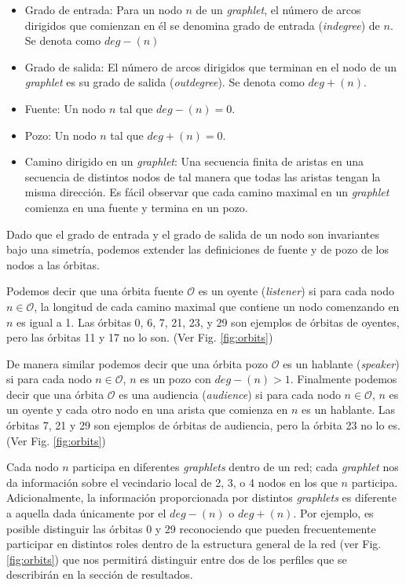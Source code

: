\begin{itemize}
    \item Grado de entrada: Para un nodo $n$ de un \textit{graphlet}, el número de arcos dirigidos que comienzan en él se denomina grado de entrada (\textit{indegree}) de $n$. Se denota como $deg-(n)$
    \item Grado de salida: El número de arcos dirigidos que terminan en el nodo de un \textit{graphlet} es su grado de salida (\textit{outdegree}). Se denota como $deg+(n)$.
    \item Fuente: Un nodo $n$ tal que $deg-(n)=0$. 
    \item Pozo: Un nodo $n$ tal que $deg+(n)=0$.
    \item Camino dirigido en un \textit{graphlet}: Una secuencia finita de aristas en una secuencia de distintos nodos de tal manera que todas las aristas tengan la misma dirección. Es fácil observar que cada camino maximal en un \textit{graphlet} comienza en una fuente y termina en un pozo. %
\end{itemize}

Dado que el grado de entrada y el grado de salida de un nodo son invariantes bajo una simetría, podemos extender las definiciones de fuente y de pozo de los nodos a las órbitas. 

Podemos decir que una órbita fuente $\mathcal{O}$ es un oyente (\emph{listener}) si para cada nodo $n\in\mathcal{O}$, la longitud de cada camino maximal que contiene un nodo comenzando en $n$ es igual a 1. Las órbitas 0, 6, 7, 21, 23, y 29 son ejemplos de órbitas de oyentes, pero las órbitas 11 y 17 no lo son. (Ver Fig. \ref{fig:orbits})

De manera similar podemos decir que una órbita pozo $\mathcal{O}$ es un hablante (\emph{speaker}) si para cada nodo  $n\in\mathcal{O}$, $n$ es un pozo con $deg-(n)>1$. Finalmente podemos decir que una órbita $\mathcal{O}$ es una audiencia (\emph{audience}) si para cada nodo $n\in\mathcal{O}$, $n$ es un oyente y cada otro nodo en una arista que comienza en $n$ es un hablante. Las órbitas 7, 21 y 29 son ejemplos de órbitas de audiencia, pero la órbita 23 no lo es. (Ver Fig. \ref{fig:orbits})

Cada nodo $n$ participa en diferentes \textit{graphlets} dentro de un red; cada \textit{graphlet} nos da información sobre el vecindario local de 2, 3, o 4 nodos en los que $n$ participa. Adicionalmente, la información proporcionada por distintos \textit{graphlets} es diferente a aquella dada únicamente por el $deg-(n)$ o $deg+(n)$. Por ejemplo, es posible distinguir las órbitas 0 y 29 reconociendo que pueden frecuentemente participar en distintos roles dentro de la estructura general de la red (ver Fig. \ref{fig:orbits}) que nos permitirá distinguir entre dos de los perfiles que se describirán en la sección de resultados.

